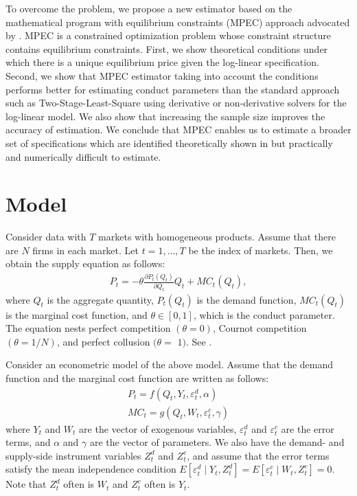 \documentclass[11pt, a4paper]{article}
\begin{document}
To overcome the problem, we propose a new estimator based on the mathematical program with equilibrium constraints (MPEC) approach advocated by \cite{su2012constrained}. 
MPEC is a constrained optimization problem whose constraint structure contains equilibrium constraints. 
First, we show theoretical conditions under which there is a unique equilibrium price given the log-linear specification.
Second, we show that MPEC estimator taking into account the conditions performs better for estimating conduct parameters than the standard approach such as Two-Stage-Least-Square using derivative or non-derivative solvers for the log-linear model.
We also show that increasing the sample size improves the accuracy of estimation.
We conclude that MPEC enables us to estimate a broader set of specifications which are identified theoretically shown in \cite{lau1982identifying} but practically and numerically difficult to estimate.


\section{Model}
Consider data with $T$ markets with homogeneous products.
Assume that there are $N$ firms in each market.
Let $t = 1,\ldots, T$ be the index of markets.
Then, we obtain the supply equation as follows:
\begin{align}
     P_t = -\theta\frac{\partial P_t(Q_{t})}{\partial Q_{t}}Q_{t} + MC_t(Q_{t}),\label{eq:supply_equation}
\end{align}
where $Q_{t}$ is the aggregate quantity, $P_t(Q_{t})$ is the demand function, $MC_{t}(Q_{t})$ is the marginal cost function, and $\theta\in[0,1]$, which is the conduct parameter. 
The equation nests perfect competition $(\theta=0)$, Cournot competition $(\theta=1 / N)$, and perfect collusion $(\theta=$ $1)$. See \cite{bresnahan1982oligopoly}.

Consider an econometric model of the above model.
Assume that the demand function and the marginal cost function are written as follows: 
\begin{align}
    P_t = f(Q_{t}, Y_t, \varepsilon^{d}_{t}, \alpha) \label{eq:demand}\\
    MC_t = g(Q_{t}, W_{t}, \varepsilon^{c}_{t}, \gamma)\label{eq:marginal_cost}
\end{align}
where $Y_t$ and $W_{t}$ are the vector of exogenous variables, $\varepsilon^{d}_{t}$ and $\varepsilon^{c}_{t}$ are the error terms, and $\alpha$ and $\gamma$ are the vector of parameters.
We also have the demand- and supply-side instrument variables $Z^{d}_{t}$ and $Z^{c}_{t}$, and assume that the error terms satisfy the mean independence condition $E[\varepsilon^{d}_{t}\mid Y_t, Z^{d}_{t}] = E[\varepsilon^{c}_{t} \mid W_{t}, Z^{c}_{t}] =0$. Note that $Z_t^d$ often is $W_t$ and $Z_t^c$ often is $Y_t$.
\end{document}
